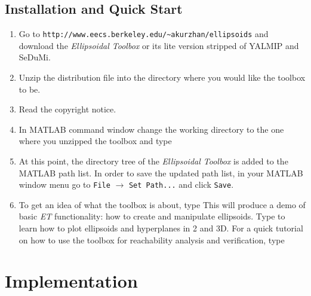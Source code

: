 \documentclass{report}
\begin{document}
\section{Installation and Quick Start}
\begin{enumerate}
\item Go to
\newline
{\tt http://www.eecs.berkeley.edu/\~{ }akurzhan/ellipsoids}
\newline
and download the {\it Ellipsoidal Toolbox} or its lite version stripped
of YALMIP and SeDuMi.
\item Unzip the distribution file into the directory where you would like
the toolbox to be.
\item Read the copyright notice.
\item In MATLAB command window change the working directory to the one where
you unzipped the toolbox and type
\newline
{}
\item At this point, the directory tree of the {\it Ellipsoidal Toolbox} is
added to the MATLAB path list. In order to save the updated path list,
in your MATLAB window menu go to {\tt File} $\rightarrow$ {\tt Set Path...} and
click {\tt Save}.
\item To get an idea of what the toolbox is about, type
\newline
{}
\newline
This will produce a demo of basic {\it ET} functionality: how to create
and manipulate ellipsoids.
\newline
Type
\newline
{}
\newline
to learn how to plot ellipsoids and hyperplanes in 2 and 3D.
\newline
For a quick tutorial on how to use the toolbox for reachability analysis
and verification, type
\newline
{}
\end{enumerate}





\chapter{Implementation}
\end{document}

